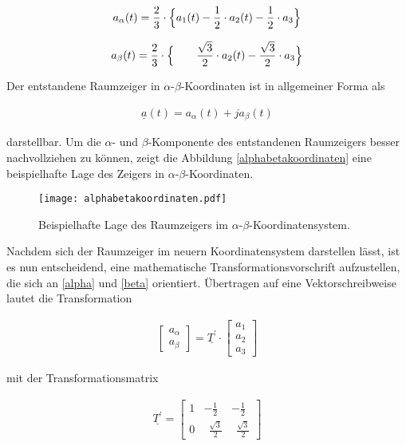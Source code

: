\begin{align}
	a_{\alpha}(t) = \frac{2}{3} \cdot \Bigl\{ a_{1}(t) - \frac{1}{2} \cdot a_{2}(t) - \frac{1}{2} \cdot a_{3}  \Bigr\}
	\label{alpha}
\end{align}

\begin{align}
	a_{\beta}(t) = \frac{2}{3} \cdot \Bigl\{ ~~~~~~ \frac{\sqrt{3}}{2} \cdot a_{2}(t) - \frac{\sqrt{3}}{2} \cdot a_{3}  \Bigr\}
	\label{beta}
\end{align}

Der entstandene Raumzeiger in  $\alpha$-$\beta$-Koordinaten ist in allgemeiner Forma als 

\begin{align}
	\underline{a}(t) = a_{\alpha}(t) +j a_{\beta}(t)
	\label{raumzeigeralphabeta}
\end{align}

darstellbar. Um die $\alpha$- und $\beta$-Komponente des entstandenen Raumzeigers besser nachvollziehen zu können, zeigt die Abbildung \ref{alphabetakoordinaten} eine beispielhafte Lage des Zeigers in $\alpha$-$\beta$-Koordinaten.

\begin{figure}[h]
	\centering
	\texttt{[image: alphabetakoordinaten.pdf]}
	\label{fig:alphabetakoordinaten}
	\caption{Beispielhafte Lage des Raumzeigers im $\alpha$-$\beta$-Koordinatensystem.}
\end{figure}

Nachdem sich der Raumzeiger im neuern Koordinatensystem darstellen lässt, ist es nun entscheidend, eine mathematische Transformationsvorschrift aufzustellen, die sich an \ref{alpha} und \ref{beta} orientiert. 
Übertragen auf eine Vektorschreibweise lautet die Transformation

\begin{align}
	\begin{bmatrix}
	a_{\alpha} \\
	a_{\beta} 
	\end{bmatrix}
	=\underline{T^\prime}\cdot 
	\begin{bmatrix}
	a_{1} \\
	a_{2} \\
	a_{3}
	\end{bmatrix}
	\label{clarkevektor}
\end{align}

mit der Transformationsmatrix

\begin{align}
	\underline{T^\prime} = 
	\begin{bmatrix}
		1 & -\frac{1}{2} & -\frac{1}{2}  \\
		0 & ~~\frac{\sqrt{3}}{2} & ~~\frac{\sqrt{3}}{2}
	\end{bmatrix}
	\label{clarkematrix}
\end{align}

